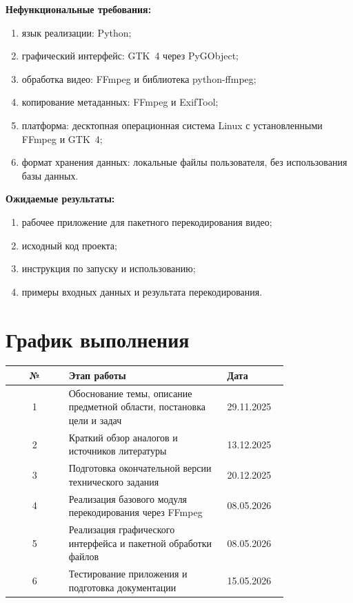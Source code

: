 \documentclass[14pt,a4paper]{extarticle}
\begin{document}
\textbf{Нефункциональные требования:}
\begin{enumerate}
	\item язык реализации: Python;
	\item графический интерфейс: GTK~4 через PyGObject;
	\item обработка видео: FFmpeg и библиотека python-ffmpeg;
	\item копирование метаданных: FFmpeg и ExifTool;
	\item платформа: десктопная операционная система Linux с установленными FFmpeg и GTK~4;
	\item формат хранения данных: локальные файлы пользователя, без использования базы данных.
\end{enumerate}

\textbf{Ожидаемые результаты:}
\begin{enumerate}
	\item рабочее приложение для пакетного перекодирования видео;
	\item исходный код проекта;
	\item инструкция по запуску и использованию;
	\item примеры входных данных и результата перекодирования.
\end{enumerate}

\section*{График выполнения}

\begin{center}
	\begin{tabular}{|c|p{0.58\linewidth}|p{0.22\linewidth}|}
		\hline
		\textbf{№} & \textbf{Этап работы}                                                   & \textbf{Дата} \\\hline
		1          & Обоснование темы, описание предметной области, постановка цели и задач & 29.11.2025    \\\hline
		2          & Краткий обзор аналогов и источников литературы                         & 13.12.2025    \\\hline
		3          & Подготовка окончательной версии технического задания                   & 20.12.2025    \\\hline
		4          & Реализация базового модуля перекодирования через FFmpeg                & 08.05.2026    \\\hline
		5          & Реализация графического интерфейса и пакетной обработки файлов         & 08.05.2026    \\\hline
		6          & Тестирование приложения и подготовка документации                      & 15.05.2026    \\\hline
	\end{tabular}
\end{center}
\end{document}
